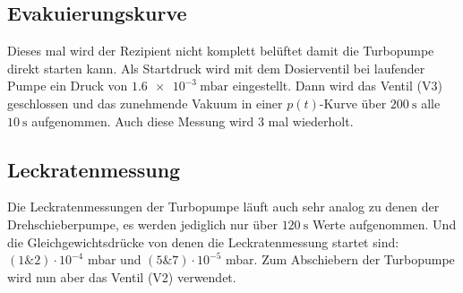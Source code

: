 		\subsection{Evakuierungskurve}

			Dieses mal wird der Rezipient nicht komplett belüftet damit die Turbopumpe direkt starten kann. 
			Als Startdruck  wird mit dem Dosierventil bei laufender Pumpe ein Druck von $\SI{1.6e-3}{\milli\bar}$ eingestellt.
			Dann wird das Ventil (V3) geschlossen und das zunehmende Vakuum in einer $p(t)$-Kurve über $\SI{200}{\second}$ alle $\SI{10}{\second}$ aufgenommen.
			Auch diese Messung wird 3 mal wiederholt.

		\subsection{Leckratenmessung}

			Die Leckratenmessungen der Turbopumpe läuft auch sehr analog zu denen der Drehschieberpumpe, es werden jediglich nur über $\SI{120}{\second}$ Werte aufgenommen. 
			Und die Gleichgewichtsdrücke von denen die Leckratenmessung startet sind: $(1 \& 2)\cdot10^{-4}$ mbar und $(5 \& 7)\cdot10^{-5}$ mbar.
			Zum Abschiebern der Turbopumpe wird nun aber das Ventil (V2) verwendet.
